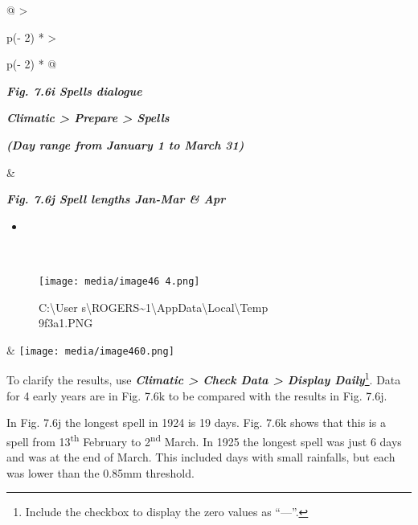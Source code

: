 \documentclass[
  letterpaper,
  DIV=11,
  numbers=noendperiod]{scrreprt}
\providecommand{\tightlist}{%
  \setlength{\itemsep}{0pt}\setlength{\parskip}{0pt}}\usepackage{longtable,booktabs,array}
\begin{document}
\begin{longtable}[]{@{}
  >{\raggedright\arraybackslash}p{(\columnwidth - 2\tabcolsep) * }
  >{\raggedright\arraybackslash}p{(\columnwidth - 2\tabcolsep) * }@{}}
\toprule\noalign{}
\begin{minipage}[b]{\linewidth}\raggedright
\textbf{\emph{Fig. 7.6i Spells dialogue}}

\textbf{\emph{Climatic \textgreater{} Prepare \textgreater{} Spells}}

\textbf{\emph{(Day range from January 1 to March 31)}}
\end{minipage} & \begin{minipage}[b]{\linewidth}\raggedright
\textbf{\emph{Fig. 7.6j Spell lengths Jan-Mar \& Apr}}

\begin{itemize}
\tightlist
\item
\end{itemize}
\end{minipage} \\
\midrule\noalign{}
\endhead
\bottomrule\noalign{}
\endlastfoot
\begin{minipage}[t]{\linewidth}\raggedright
\begin{figure}[H]

{\centering \texttt{[image: media/image46 4.png]}

}

\caption{C:\textbackslash User
s\textbackslash ROGERS\textasciitilde1\textbackslash AppData\textbackslash Local\textbackslash Temp\\
\SNAGHTMLac9f3a1.PNG}

\end{figure}%
\end{minipage} &
\texttt{[image: media/image460.png]} \\
\end{longtable}

To clarify the results, use \textbf{\emph{Climatic \textgreater{} Check
Data \textgreater{} Display Daily}}\footnote{Include the checkbox to
  display the zero values as ``---''.}. Data for 4 early years are in
Fig. 7.6k to be compared with the results in Fig. 7.6j.

In Fig. 7.6j the longest spell in 1924 is 19 days. Fig. 7.6k shows that
this is a spell from 13\textsuperscript{th} February to
2\textsuperscript{nd} March. In 1925 the longest spell was just 6 days
and was at the end of March. This included days with small rainfalls,
but each was lower than the 0.85mm threshold.
\end{document}
